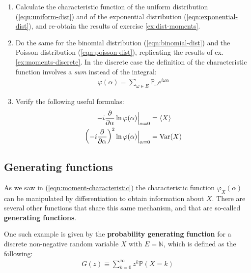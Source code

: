 \documentclass[../template.tex]{subfiles}
\begin{document}
\begin{exo}
    \begin{enumerate}[label=\alph*.]
        \item Calculate the characteristic function of the uniform distribution (\ref{eqn:uniform-dist}) and of the exponential distribution (\ref{eqn:exponential-dist}), and re-obtain the results of exercise \ref{ex:dist-moments}.
        \item Do the same for the binomial distribution (\ref{eqn:binomial-dist}) and the Poisson distribution (\ref{eqn:poisson-dist}), replicating the results of ex. \ref{ex:moments-discrete}. In the discrete case the definition of the characteristic function involves a \textit{sum} instead of the integral:
        \begin{align*}
            \varphi(\alpha) = \sum_{\omega \in E} \mathbb{P}_\omega e^{i \omega \alpha}
        \end{align*} 
        \item Verify the following useful formulas:
        \begin{subequations}
            \begin{align}\label{eqn:f1}
                -i\pdv{\alpha} \ln\varphi(\alpha) \Big|_{\alpha = 0} &= \langle X \rangle\\
                \left(-i\pdv{\alpha}\right)^2 \ln\varphi(\alpha) \Big|_{\alpha = 0} &= \operatorname{Var}(X) \label{eqn:f2}
            \end{align}
        \end{subequations}
    \end{enumerate}
    
\end{exo}

\subsection{Generating functions}
As we saw in (\ref{eqn:moment-characteristic}) the characteristic function $\varphi_X(\alpha)$ can be manipulated by differentiation to obtain information about $X$. There are several other functions that share this same mechanism, and that are so-called \textbf{generating functions}. 

\medskip

One such example is given by the \textbf{probability generating function} for a discrete non-negative random variable $X$ with $E = \mathbb{N}$, which is defined as the following:
\begin{align}\label{eqn:pgenerating}
    G(z) \equiv \sum_{k=0}^{\infty} z^k \mathbb{P}(X=k)
\end{align} 
\end{document}
